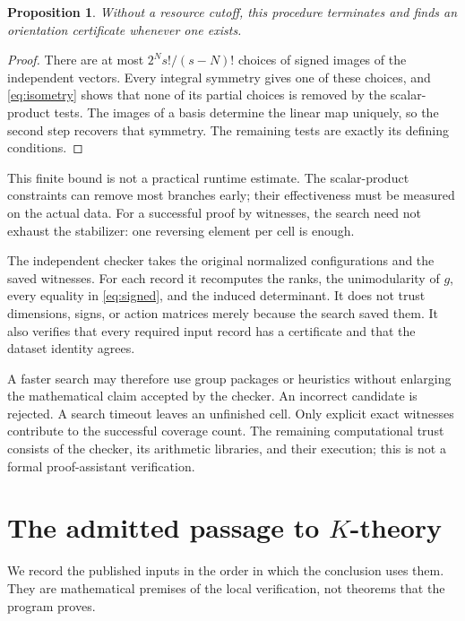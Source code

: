 \documentclass[11pt,a4paper]{article}
\numberwithin{equation}{section}
\newtheorem{proposition}{Proposition}[section]
\theoremstyle{definition}
\theoremstyle{remark}
\begin{document}
\begin{proposition}\label{prop:search}
Without a resource cutoff, this procedure terminates and finds an
orientation certificate whenever one exists.
\end{proposition}

\begin{proof}
There are at most
\(2^N s!/(s-N)!\) choices of signed images of the independent vectors.
Every integral symmetry gives one of these choices, and
\eqref{eq:isometry} shows that none of its partial choices is removed
by the scalar-product tests. The images of a basis determine the
linear map uniquely, so the second step recovers that symmetry.
The remaining tests are exactly its defining conditions.
\end{proof}

This finite bound is not a practical runtime estimate.
The scalar-product constraints can remove most branches early;
their effectiveness must be measured on the actual data.
For a successful proof by witnesses, the search need not exhaust
the stabilizer: one reversing element per cell is enough.

The independent checker takes the original normalized configurations
and the saved witnesses. For each record it recomputes the ranks,
the unimodularity of \(g\), every equality in \eqref{eq:signed},
and the induced determinant. It does not trust dimensions, signs,
or action matrices merely because the search saved them.
It also verifies that every required input record has a certificate
and that the dataset identity agrees.

A faster search may therefore use group packages or heuristics without
enlarging the mathematical claim accepted by the checker. An incorrect
candidate is rejected. A search timeout leaves an unfinished cell.
Only explicit exact witnesses contribute to the successful coverage
count. The remaining computational trust consists of the checker,
its arithmetic libraries, and their execution; this is not a
formal proof-assistant verification.

\section{The admitted passage to \texorpdfstring{\(K\)}{K}-theory}\label{sec:bridge}

We record the published inputs in the order in which the conclusion
uses them. They are mathematical premises of the local verification,
not theorems that the program proves.
\end{document}
